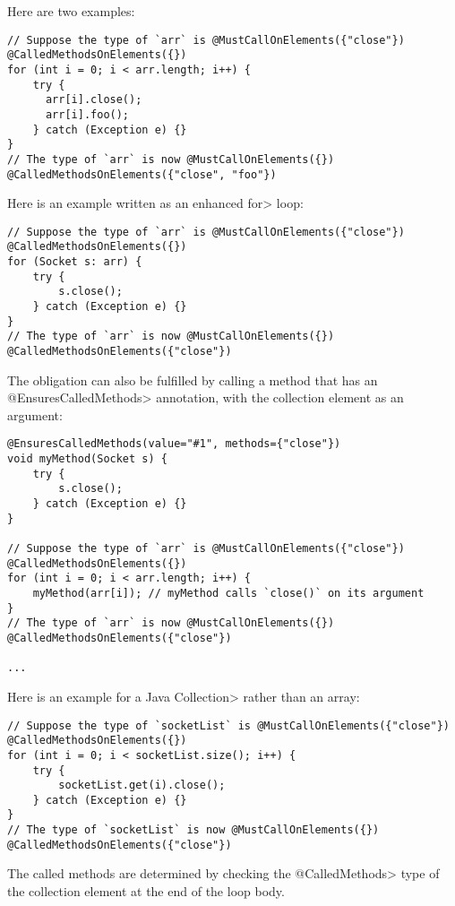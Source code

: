 Here are two examples:

\begin{verbatim}
// Suppose the type of `arr` is @MustCallOnElements({"close"}) @CalledMethodsOnElements({})
for (int i = 0; i < arr.length; i++) {
    try {
      arr[i].close();
      arr[i].foo();
    } catch (Exception e) {}
}
// The type of `arr` is now @MustCallOnElements({}) @CalledMethodsOnElements({"close", "foo"})
\end{verbatim}

Here is an example written as an enhanced \<for> loop:

\begin{verbatim}
// Suppose the type of `arr` is @MustCallOnElements({"close"}) @CalledMethodsOnElements({})
for (Socket s: arr) {
    try {
        s.close();
    } catch (Exception e) {}
}
// The type of `arr` is now @MustCallOnElements({}) @CalledMethodsOnElements({"close"})
\end{verbatim}


The obligation can also be fulfilled by calling a method that has an
\<@EnsuresCalledMethods> annotation, with the collection element as an
argument:
\begin{verbatim}
@EnsuresCalledMethods(value="#1", methods={"close"})
void myMethod(Socket s) {
    try {
        s.close();
    } catch (Exception e) {}
}

// Suppose the type of `arr` is @MustCallOnElements({"close"}) @CalledMethodsOnElements({})
for (int i = 0; i < arr.length; i++) {
    myMethod(arr[i]); // myMethod calls `close()` on its argument
}
// The type of `arr` is now @MustCallOnElements({}) @CalledMethodsOnElements({"close"})

...

\end{verbatim}

Here is an example for a Java \<Collection> rather than an array:

\begin{verbatim}
// Suppose the type of `socketList` is @MustCallOnElements({"close"}) @CalledMethodsOnElements({})
for (int i = 0; i < socketList.size(); i++) {
    try {
        socketList.get(i).close();
    } catch (Exception e) {}
}
// The type of `socketList` is now @MustCallOnElements({}) @CalledMethodsOnElements({"close"})
\end{verbatim}

The called methods are
determined by checking the \<@CalledMethods> type of the collection element at
the end of the loop body.

